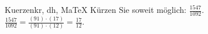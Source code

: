 \begin{MAufgabe}{Kuerzen}{kr, dh, MaTeX}
K\"urzen Sie soweit m\"oglich: $\frac{1547}{1092}$.\\ 
\ifLsg\MLoesung
\quad $\frac{1547}{1092}=\frac{(91)\cdot(17)}{(91)\cdot(12)}=\frac{17}{12}$.\else\relax\fi
 \end{MAufgabe}